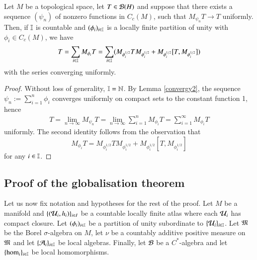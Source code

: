 \documentclass[leqno]{amsart}
\begin{document}
	\begin{lemma}\label{representation}
		Let $M$ be a topological space, let $T\in {\mathcal B}(H)$ and suppose that there exists a sequence $(\psi_n)$ of nonzero functions in $C_{c}(M)$, such that $M_{\psi_n}T\to T$ uniformly. Then, if $\mathbb I$ is countable and $(\phi_i)_{i\in\mathbb I}$ is a locally finite partition of unity with $\phi_{i}\in C_{c}(M)$, we have
		$$T=\sum_{i\in\mathbb I} M_{\phi_i}T=\sum_{i\in\mathbb I} (M_{\phi_i^{1/2}} TM_{\phi_i^{1/2}}+M_{\phi_i^{1/2}}[T, M_{\phi_i^{1/2}}])$$
		with the series converging uniformly.
	\end{lemma}
	\begin{proof}
		Without loss of generality, $\mathbb I=\mathbb{N}$. By Lemma \ref{convergy2}, the sequence $\psi_n:=\sum_{i=1}^n\phi_i$ converges uniformly on compact sets to the constant function 1, hence
		\begin{align*}
			T=\lim_{n\to\infty} M_{\psi_n}T=\lim_{n\to\infty} \sum_{i=1}^nM_{\phi_i}T=\sum_{i=1}^\infty M_{\phi_i}T
		\end{align*}
		uniformly. The second identity follows from the observation that
		$$M_{\phi_i}T=M_{\phi_i^{1/2}} TM_{\phi_i^{1/2}}+M_{\phi_i^{1/2}}[T, M_{\phi_i^{1/2}}]$$
		for any $i\in\mathbb I$.
	\end{proof}
	
	
	
	
	
	
	\subsection{Proof of the globalisation theorem}
	
	Let us now fix notation and hypotheses for the rest of the proof. Let $M$ be a manifold and $\{({\mathcal U}_i, h_i)\}_{i\in I}$ be a countable locally finite atlas where each ${\mathcal U}_i$ has compact closure. Let $(\phi_i)_{i\in\mathbb I}$ be a partition of unity subordinate to $\{{\mathcal U}_i\}_{i\in\mathbb I}$. Let $\mathfrak M$ be the Borel $\sigma$-algebra on $M$, let $\nu$ be a countably additive positive measure on $\mathfrak M$ and let $\{{\mathcal A}_i\}_{i\in\mathbb I}$ be local algebras. Finally, let ${\mathcal B}$ be a $C^*$-algebra and let $\{{\rm hom}_i\}_{i\in\mathbb I}$ be local homomorphisms.
	
\end{document}
